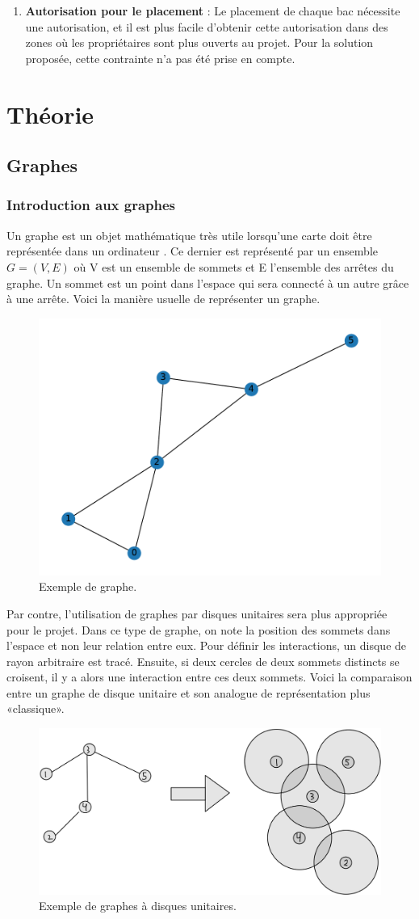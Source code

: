 \documentclass[11pt]{article}
\begin{document}
\begin{enumerate}
    \item\textbf{Autorisation pour le placement} : Le placement de chaque bac nécessite une autorisation, et il est plus facile d’obtenir cette autorisation dans des zones où les propriétaires sont plus ouverts au projet. Pour la solution proposée, cette contrainte n'a pas été prise en compte.
\end{enumerate}

\section{Théorie}
\subsection{Graphes}
\subsubsection{Introduction aux graphes}
Un graphe est un objet mathématique très utile lorsqu'une carte doit être représentée dans un ordinateur \cite{mackaness_use_1993}\cite{riaz_applications_2011}. Ce dernier est représenté par un ensemble $G=(V,E)$ où V est un ensemble de sommets et E l'ensemble des arrêtes du graphe. Un sommet est un point dans l'espace qui sera connecté à un autre grâce à une arrête. Voici la manière usuelle de représenter un graphe.

\begin{figure}[H]
    \centering
        \includegraphics[width=0.45\linewidth]{images/graphe_MIS_exemple.pdf}
        \caption{Exemple de graphe.}
    \label{graph_exemple}
\end{figure}

Par contre, l'utilisation de graphes par disques unitaires sera plus appropriée pour le projet. Dans ce type de graphe, on note la position des sommets dans l'espace et non leur relation entre eux. Pour définir les interactions, un disque de rayon arbitraire est tracé. Ensuite, si deux cercles de deux sommets distincts se croisent, il y a alors une interaction entre ces deux sommets. Voici la comparaison entre un graphe de disque unitaire et son analogue de représentation plus «classique». 
\begin{figure}[H]
    \centering
        \includegraphics[width=0.45\linewidth]{images/disk_ex.jpg}
        \caption{Exemple de graphes à disques unitaires.}
    \label{disk_example}
\end{figure}
\end{document}
